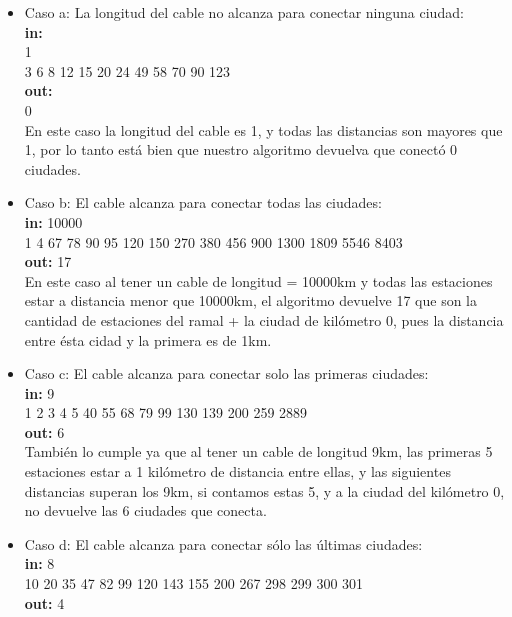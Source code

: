 \begin{itemize}
\item Caso a: La longitud del cable no alcanza para conectar ninguna ciudad:\\
\textbf{in:}\\
1\\
3 6 8 12 15 20 24 49 58 70 90 123 \\
\textbf{out:}\\
0\\

En este caso la longitud del cable es 1, y todas las distancias son mayores que 1, por lo tanto está bien que nuestro algoritmo devuelva que conectó 0 ciudades.\\

\item Caso b: El cable alcanza para conectar todas las ciudades:\\
\textbf{in:}
10000\\
1 4 67 78 90 95 120 150 270 380 456 900 1300 1809 5546 8403\\
\textbf{out:}
17\\

En este caso al tener un cable de longitud = 10000km y todas las estaciones estar a distancia menor que 10000km, el algoritmo devuelve 17 que son la cantidad de estaciones del ramal + la ciudad de kilómetro 0, pues la distancia entre ésta cidad y la primera es de 1km. \\

\item Caso c: El cable alcanza para conectar solo las primeras ciudades:\\
\textbf{in:}
9\\
1 2 3 4 5 40 55 68 79 99 130 139 200 259 2889\\
\textbf{out:}
6\\

También lo cumple ya que al tener un cable de longitud 9km, las primeras 5 estaciones estar a 1 kilómetro de distancia entre ellas, y las siguientes distancias superan los 9km, si contamos estas 5, y a la ciudad del kilómetro 0, no devuelve las 6 ciudades que conecta.\\

\item Caso d: El cable alcanza para conectar sólo las últimas ciudades:\\
\textbf{in:}
8\\
10 20 35 47 82 99 120 143 155 200 267 298 299 300 301\\
\textbf{out:}
4\\


\end{itemize}
